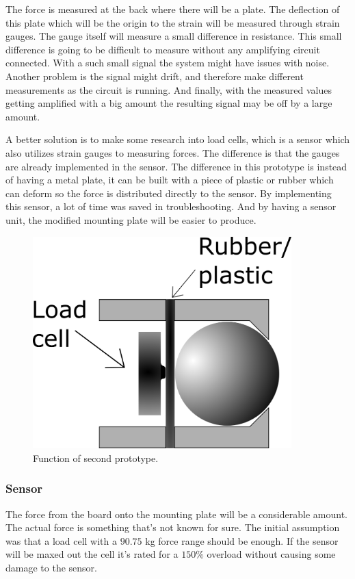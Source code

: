 The force is measured at the back where there will be a plate. The deflection of this plate which will be the origin to the strain will be measured through strain gauges. 
The gauge itself will measure a small difference in resistance. This small difference is going to be difficult to measure without any amplifying circuit connected. With a such small signal the system might have issues with noise. Another problem is the signal might drift, and therefore make different measurements as the circuit is running. And finally, with the measured values getting amplified with a big amount the resulting signal may be off by a large amount. 

A better solution is to make some research into load cells, which is a sensor which also utilizes strain gauges to measuring forces. The difference is that the gauges are already implemented in the sensor. The difference in this prototype is instead of having a metal plate, it can be built with a piece of plastic or rubber which can deform so the force is distributed directly to the sensor. By implementing this sensor, a lot of time was saved in troubleshooting. And by having a sensor unit, the modified mounting plate will be easier to produce. 
 
\begin{figure}[H]
\begin{center}
	\includegraphics[width = 10cm]{Figures/Press_sens_func_2.png}
	\caption{Function of second prototype.}
	\label{Press_sens_prot_2}
\end{center}
\end{figure}


\subsubsection{Sensor}
The force from the board onto the mounting plate will be a considerable amount. The actual force is something that’s not known for sure. The initial assumption was that a load cell with a $90.75$ kg force range should be enough. If the sensor will be maxed out the cell it's rated for a $150\%$ overload without causing some damage to the sensor.  

